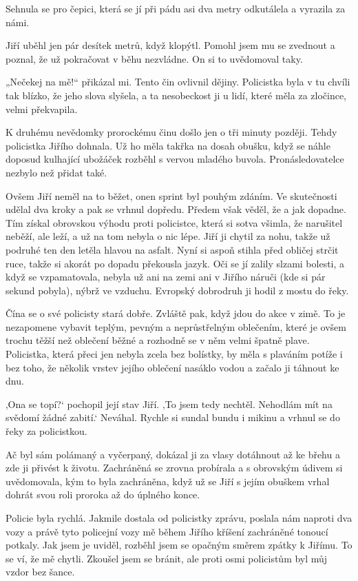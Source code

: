 Sehnula se pro čepici, která se jí při pádu asi dva metry odkutálela a vyrazila za námi.

Jiří uběhl jen pár desítek metrů, když klopýtl. Pomohl jsem mu se zvednout a poznal, že už pokračovat v běhu nezvládne. On si to uvědomoval taky.

 „Nečekej na mě!“ přikázal mi. Tento čin ovlivnil dějiny. Policistka byla v tu chvíli tak blízko, že jeho slova slyšela, a ta nesobeckost ji u lidí, které měla za zločince, velmi překvapila.

K druhému nevědomky prorockému činu došlo jen o tři minuty později. Tehdy policistka Jiřího dohnala. Už ho měla takřka na dosah obušku, když se náhle doposud kulhající ubožáček rozběhl s vervou mladého buvola. Pronásledovatelce nezbylo než přidat také. 

Ovšem Jiří neměl na to běžet, onen sprint byl pouhým zdáním. Ve skutečnosti udělal dva kroky a pak se vrhnul dopředu. Předem však věděl, že a jak dopadne. Tím získal obrovskou výhodu proti policistce, která si sotva všimla, že narušitel neběží, ale leží, a už na tom nebyla o nic lépe. Jiří ji chytil za nohu, takže už podruhé ten den letěla hlavou na asfalt. Nyní si aspoň stihla před obličej strčit ruce, takže si akorát po dopadu překousla jazyk. Oči se jí zalily slzami bolesti, a když se vzpamatovala, nebyla už ani na zemi ani v Jiřího náruči (kde si pár sekund pobyla), nýbrž ve vzduchu. Evropský dobrodruh ji hodil z mostu do řeky.

Čína se o své policisty stará dobře. Zvláště pak, když jdou do akce v zimě. To je nezapomene vybavit teplým, pevným a neprůstřelným oblečením, které je ovšem trochu těžší než oblečení běžné a rozhodně se v něm velmi špatně plave. Policistka, která přeci jen nebyla zcela bez bolístky, by měla s plaváním potíže i bez toho, že několik vrstev jejího oblečení nasáklo vodou a začalo ji táhnout ke dnu.

‚Ona se topí?‘ pochopil její stav Jiří. ‚To jsem tedy nechtěl. Nehodlám mít na svědomí žádné zabití.‘ Neváhal. Rychle si sundal bundu i mikinu a vrhnul se do řeky za policistkou.

Ač byl sám polámaný a vyčerpaný, dokázal ji za vlasy dotáhnout až ke břehu a zde ji přivést k životu. Zachráněná se zrovna probírala a s obrovským údivem si uvědomovala, kým to byla zachráněna, když už se Jiří s jejím obuškem vrhal dohrát svou roli proroka až do úplného konce.
\vspace{0.75cm}

Policie byla rychlá. Jakmile dostala od policistky zprávu, poslala nám naproti dva vozy a právě tyto policejní vozy mě během Jiřího kříšení zachráněné tonoucí potkaly. Jak jsem je uviděl, rozběhl jsem se opačným směrem zpátky k Jiřímu. To se ví, že mě chytli. Zkoušel jsem se bránit, ale proti osmi policistům byl můj vzdor bez šance.

